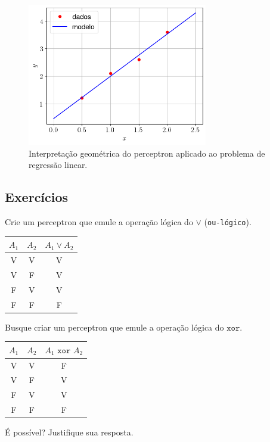 \begin{figure}[H]
  \centering
  \includegraphics[width=0.7\textwidth]{./cap_perceptron/dados/fig_percep_mq/main}
  \caption{Interpretação geométrica do perceptron aplicado ao problema de regressão linear.}
  \label{fig:percep_mq}
\end{figure}

\subsection{Exercícios}

\begin{exer}
  Crie um perceptron que emule a operação lógica do $\lor$ (\texttt{ou-lógico}).
  \begin{center}
    \begin{tabular}{cc|c}
      $A_1$ & $A_2$ & $A_1\lor A_2$\\\hline
      V & V & V\\
      V & F & V\\
      F & V & V\\
      F & F & F\\\hline
    \end{tabular}
  \end{center}
\end{exer}

\begin{exer}
  Busque criar um perceptron que emule a operação lógica do $\texttt{xor}$.
  \begin{center}
    \begin{tabular}{cc|c}
      $A_1$ & $A_2$ & $A_1\texttt{ xor }A_2$\\\hline
      V & V & F\\
      V & F & V\\
      F & V & V\\
      F & F & F\\\hline
    \end{tabular}
  \end{center}
  É possível? Justifique sua resposta.
\end{exer}


